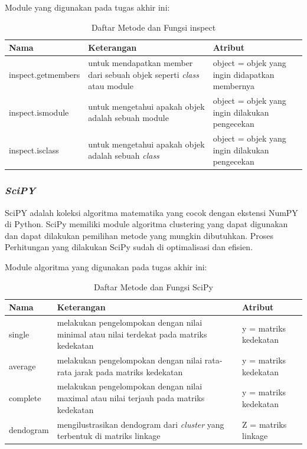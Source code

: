Module yang digunakan pada tugas akhir ini:
\begingroup
\setlength{\LTleft}{-20cm plus -1fill}
\setlength{\LTright}{\LTleft}
\begin{small}
	\begin{longtable}{|p{3cm}|p{5cm}|p{4.5cm}|}
		\caption{Daftar Metode dan Fungsi inspect}\\
		\hline
		\textbf{Nama} & \textbf{Keterangan} & \textbf{Atribut}\\
		\endfirsthead
		
		\hline
		    inspect.getmembers
		  &  untuk mendapatkan member dari sebuah objek seperti \textit{class} atau module
		  & object = objek yang ingin didapatkan membernya\\
		\hline 
		    inspect.ismodule
		  & untuk mengetahui apakah objek adalah sebuah module
		  & object = objek yang ingin dilakukan pengecekan\\
		\hline  
		\hline
		    inspect.isclass
		  & untuk mengetahui apakah objek adalah sebuah \textit{class}
		  & object = objek yang ingin dilakukan pengecekan\\
		\hline  
	\end{longtable}
\end{small}
\endgroup

\subsubsection{\textit{SciPY} \cite{scipy}}
SciPY adalah koleksi algoritma matematika yang cocok dengan ekstensi NumPY di Python. SciPy memiliki module algoritma clustering yang dapat digunakan dan dapat dilakukan pemilihan metode yang mungkin dibutuhkan. Proses Perhitungan yang dilakukan SciPy sudah di optimalisasi dan efisien.

Module algoritma yang digunakan pada tugas akhir ini:
\begingroup
\setlength{\LTleft}{-20cm plus -1fill}
\setlength{\LTright}{\LTleft}
\begin{small}
	\begin{longtable}{|p{3cm}|p{5cm}|p{4.5cm}|}
		\caption{Daftar Metode dan Fungsi SciPy}\\
		\hline
		\textbf{Nama} & \textbf{Keterangan} & \textbf{Atribut}\\
		\endfirsthead
		
		\hline
		 	single
		  & melakukan pengelompokan dengan nilai minimal atau nilai terdekat pada matriks kedekatan
		  & y = matriks kedekatan \\
		\hline  
		 average
		  & melakukan pengelompokan dengan nilai rata-rata jarak pada matriks kedekatan
		  & y = matriks kedekatan \\
		\hline  
		complete
		  & melakukan pengelompokan dengan nilai maximal atau nilai terjauh pada matriks kedekatan
		  & y = matriks kedekatan \\
		  \hline  
		dendogram
		  & mengilustrasikan dendogram dari \textit{cluster} yang terbentuk di matriks linkage
		  & Z = matriks linkage  \\
		\hline  
	\end{longtable}
\end{small}
\endgroup


